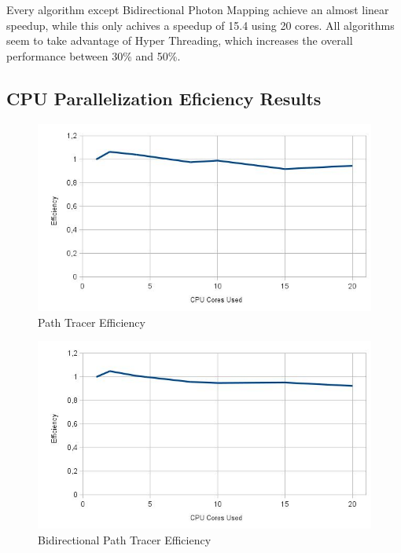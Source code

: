 Every algorithm except Bidirectional Photon Mapping achieve an almost linear speedup, while this only achives a speedup of 15.4 using 20 cores. All algorithms seem to take advantage of Hyper Threading, which increases the overall performance between 30\% and 50\%.

\subsection{CPU Parallelization Eficiency Results}

\begin{figure}[H]
\includegraphics[width=\linewidth]{img/ptEff.jpg}
\caption{\label{img:ptEff} Path Tracer Efficiency}
\end{figure}

\begin{figure}[H]
\includegraphics[width=\linewidth]{img/bptEff.jpg}
\caption{\label{img:bptEff} Bidirectional Path Tracer Efficiency}
\end{figure}

